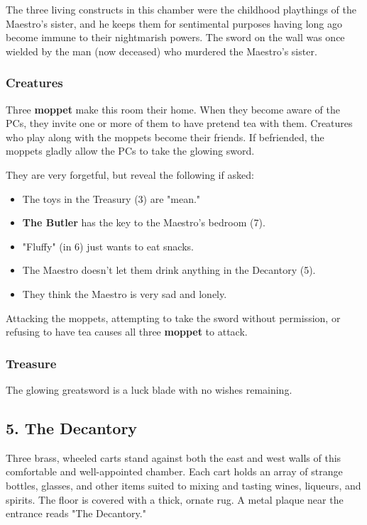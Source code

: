 \documentclass[10pt,a4paper,twoside,bg=print,twocolumn,openany,nodeprecatedcode]{dndbook}
\begin{document}
The three living constructs in this chamber were the childhood playthings of the Maestro's sister, and he keeps them for sentimental purposes having long ago become immune to their nightmarish powers. The sword on the wall was once wielded by the man (now deceased) who murdered the Maestro's sister.

\subsubsection{Creatures}
Three \textbf{moppet} make this room their home. When they become aware of the PCs, they invite one or more of them to have pretend tea with them. Creatures who play along with the moppets become their friends. If befriended, the moppets gladly allow the PCs to take the glowing sword.

They are very forgetful, but reveal the following if asked:


\begin{itemize}
\item The toys in the Treasury (3) are "mean."
\item \textbf{The Butler} has the key to the Maestro's bedroom (7).
\item "Fluffy" (in 6) just wants to eat snacks.
\item The Maestro doesn't let them drink anything in the Decantory (5).
\item They think the Maestro is very sad and lonely.
\end{itemize}

Attacking the moppets, attempting to take the sword without permission, or refusing to have tea causes all three \textbf{moppet} to attack.

\subsubsection{Treasure}
The glowing greatsword is a luck blade with no wishes remaining.

\subsection{5. The Decantory}
\begin{DndReadAloud}{}
Three brass, wheeled carts stand against both the east and west walls of this comfortable and well-appointed chamber. Each cart holds an array of strange bottles, glasses, and other items suited to mixing and tasting wines, liqueurs, and spirits. The floor is covered with a thick, ornate rug. A metal plaque near the entrance reads "The Decantory."

\end{DndReadAloud}
\end{document}

